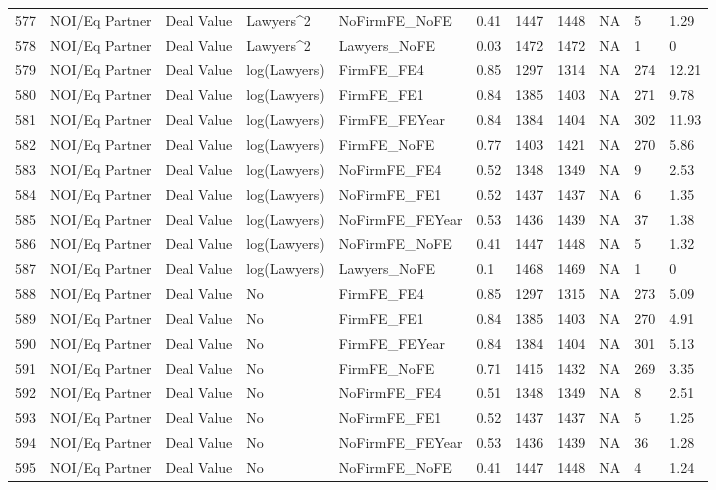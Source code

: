 \documentclass{article}
\begin{document}
\begin{table}[H]
\begin{tabular}{rllllllllll}
  577 & NOI/Eq Partner & Deal Value & Lawyers^2 & NoFirmFE\_NoFE & 0.41 & 1447 & 1448 & NA & 5 & 1.29 \\
  578 & NOI/Eq Partner & Deal Value & Lawyers^2 & Lawyers\_NoFE & 0.03 & 1472 & 1472 & NA & 1 & 0 \\
  579 & NOI/Eq Partner & Deal Value & log(Lawyers) & FirmFE\_FE4 & 0.85 & 1297 & 1314 & NA & 274 & 12.21 \\
  580 & NOI/Eq Partner & Deal Value & log(Lawyers) & FirmFE\_FE1 & 0.84 & 1385 & 1403 & NA & 271 & 9.78 \\
  581 & NOI/Eq Partner & Deal Value & log(Lawyers) & FirmFE\_FEYear & 0.84 & 1384 & 1404 & NA & 302 & 11.93 \\
  582 & NOI/Eq Partner & Deal Value & log(Lawyers) & FirmFE\_NoFE & 0.77 & 1403 & 1421 & NA & 270 & 5.86 \\
  583 & NOI/Eq Partner & Deal Value & log(Lawyers) & NoFirmFE\_FE4 & 0.52 & 1348 & 1349 & NA & 9 & 2.53 \\
  584 & NOI/Eq Partner & Deal Value & log(Lawyers) & NoFirmFE\_FE1 & 0.52 & 1437 & 1437 & NA & 6 & 1.35 \\
  585 & NOI/Eq Partner & Deal Value & log(Lawyers) & NoFirmFE\_FEYear & 0.53 & 1436 & 1439 & NA & 37 & 1.38 \\
  586 & NOI/Eq Partner & Deal Value & log(Lawyers) & NoFirmFE\_NoFE & 0.41 & 1447 & 1448 & NA & 5 & 1.32 \\
  587 & NOI/Eq Partner & Deal Value & log(Lawyers) & Lawyers\_NoFE & 0.1 & 1468 & 1469 & NA & 1 & 0 \\
  588 & NOI/Eq Partner & Deal Value & No & FirmFE\_FE4 & 0.85 & 1297 & 1315 & NA & 273 & 5.09 \\
  589 & NOI/Eq Partner & Deal Value & No & FirmFE\_FE1 & 0.84 & 1385 & 1403 & NA & 270 & 4.91 \\
  590 & NOI/Eq Partner & Deal Value & No & FirmFE\_FEYear & 0.84 & 1384 & 1404 & NA & 301 & 5.13 \\
  591 & NOI/Eq Partner & Deal Value & No & FirmFE\_NoFE & 0.71 & 1415 & 1432 & NA & 269 & 3.35 \\
  592 & NOI/Eq Partner & Deal Value & No & NoFirmFE\_FE4 & 0.51 & 1348 & 1349 & NA & 8 & 2.51 \\
  593 & NOI/Eq Partner & Deal Value & No & NoFirmFE\_FE1 & 0.52 & 1437 & 1437 & NA & 5 & 1.25 \\
  594 & NOI/Eq Partner & Deal Value & No & NoFirmFE\_FEYear & 0.53 & 1436 & 1439 & NA & 36 & 1.28 \\
  595 & NOI/Eq Partner & Deal Value & No & NoFirmFE\_NoFE & 0.41 & 1447 & 1448 & NA & 4 & 1.24 \\

\end{tabular}
\end{table}
\end{document}

